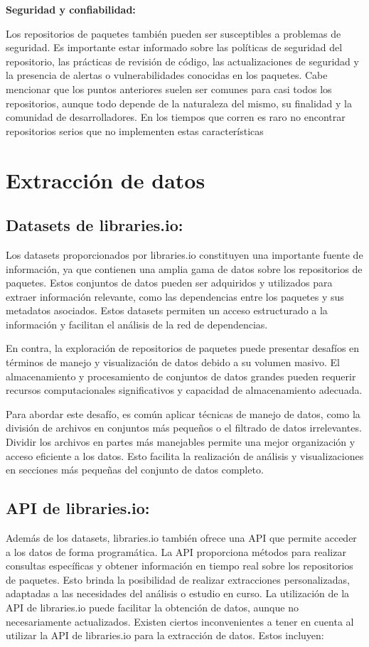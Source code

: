 \textbf{Seguridad y confiabilidad:}

Los repositorios de paquetes también pueden ser susceptibles a problemas de seguridad. Es importante estar informado sobre las políticas de seguridad del repositorio, las prácticas de revisión de código, las actualizaciones de seguridad y la presencia de alertas o vulnerabilidades conocidas en los paquetes.
Cabe mencionar que los puntos anteriores suelen ser comunes para casi todos los repositorios, aunque todo depende de la naturaleza del mismo, su finalidad y la comunidad de desarrolladores. En los tiempos que corren es raro no encontrar repositorios serios que no implementen estas características

\section{Extracción de datos}

\subsection{Datasets de libraries.io:}

Los datasets proporcionados por libraries.io constituyen una importante fuente de información, ya que contienen una amplia gama de datos sobre los repositorios de paquetes. Estos conjuntos de datos pueden ser adquiridos y utilizados para extraer información relevante, como las dependencias entre los paquetes y sus metadatos asociados. Estos datasets permiten un acceso estructurado a la información y facilitan el análisis de la red de dependencias.

En contra, la exploración de repositorios de paquetes puede presentar desafíos en términos de manejo y visualización de datos debido a su volumen masivo. El almacenamiento y procesamiento de conjuntos de datos grandes pueden requerir recursos computacionales significativos y capacidad de almacenamiento adecuada.

Para abordar este desafío, es común aplicar técnicas de manejo de datos, como la división de archivos en conjuntos más pequeños o el filtrado de datos irrelevantes. Dividir los archivos en partes más manejables permite una mejor organización y acceso eficiente a los datos. Esto facilita la realización de análisis y visualizaciones en secciones más pequeñas del conjunto de datos completo.


\subsection{API de libraries.io:}
Además de los datasets, libraries.io también ofrece una API que permite acceder a los datos de forma programática. La API proporciona métodos para realizar consultas específicas y obtener información en tiempo real sobre los repositorios de paquetes. Esto brinda la posibilidad de realizar extracciones personalizadas, adaptadas a las necesidades del análisis o estudio en curso. La utilización de la API de libraries.io puede facilitar la obtención de datos, aunque no necesariamente actualizados.
Existen ciertos inconvenientes a tener en cuenta al utilizar la API de libraries.io para la extracción de datos. Estos incluyen:

